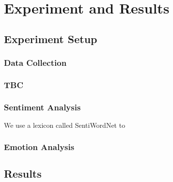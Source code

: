 \section{Experiment and Results}

\subsection{Experiment Setup}

\subsubsection{Data Collection}

\subsubsection{TBC}

\subsubsection{Sentiment Analysis}

We use a lexicon called SentiWordNet to

\subsubsection{Emotion Analysis}

\subsection{Results}
